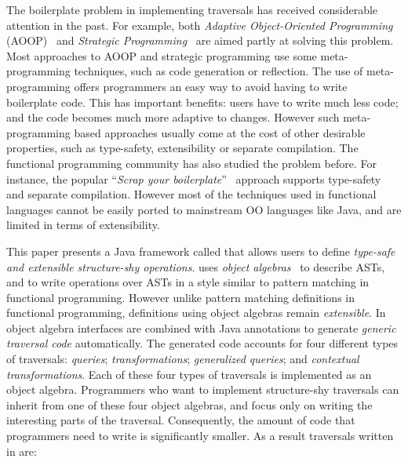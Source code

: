 The boilerplate problem in implementing traversals has received
considerable attention in the past. For example, both \emph{Adaptive
  Object-Oriented Programming} (AOOP)~\cite{DemeterBook} and
\emph{Strategic Programming}~\cite{borovansky1996elan,visser1998core}
are aimed partly at solving this problem. Most approaches to AOOP and
strategic programming use some meta-programming techniques, such as
code generation or reflection. The use of meta-programming offers
programmers an easy way to avoid having to write boilerplate code.
This has important benefits: users have to write much less code; and 
the code becomes much more adaptive to changes.
However such meta-programming based approaches usually come at the cost of
other desirable properties, such as type-safety, extensibility or
separate compilation. The functional programming community has also
studied the problem before. For instance, the popular ``\emph{Scrap your
boilerplate}''~\cite{ralf03syb} approach supports type-safety and
separate compilation. However most of the techniques used in
functional languages cannot be easily ported to mainstream OO
languages like Java, and are limited in terms of extensibility.



This paper presents a Java framework called \name that allows users to
define \emph{type-safe and extensible structure-shy operations}. \name
uses \emph{object algebras}~\cite{bruno12oa} to describe ASTs, and to
write operations over ASTs in a style similar to pattern matching in
functional programming. However unlike pattern matching definitions in
functional programming, definitions using object algebras remain
\emph{extensible}. In \name object algebra interfaces are combined
with Java annotations to generate \emph{generic traversal code} automatically. The
generated code accounts for four different types of traversals:
\emph{queries}; \emph{transformations}; \emph{generalized queries};
and \emph{contextual transformations}.  Each of these four types of
traversals is implemented as an object algebra. Programmers who want
to implement structure-shy traversals can inherit from one of these
four object algebras, and focus only on writing the interesting parts
of the traversal. Consequently, the amount of code that programmers
need to write is significantly smaller.  As a result traversals written
in \name are:

